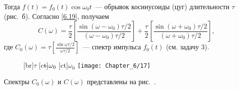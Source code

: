 Тогда $f(t)=f_0(t)\cos\omega_0 t$~--- обрывок косинусоиды (цуг) длительности $\tau$ (рис.~б). Согласно \eqref{6.19},
получаем
\begin{equation*}
	C(\omega)=\frac{\tau}{2}\left[\frac{\sin(\omega-\omega_0)\tau/2}{(\omega-\omega_0)\tau/2}\right]+
\frac{\tau}{2}\left[\frac{\sin(\omega+\omega_0)\tau/2}{(\omega+\omega_0)\tau/2}\right],
\end{equation*}
где $C_0(\omega)=\tau\left[\frac{\sin\omega\tau/2}{\omega\tau/2}\right]$~--- спектр импульса $f_0(t)$ (см. задачу 3).

\begin{figure}
	[br]{$\tau$}
	[ct]{$\llap{$-$}\omega_0$}
	[ct]{$\omega_0$}
	\texttt{[image: Chapter\_6/17]}
	\caption{}
\end{figure}

Спектры $C_0(\omega)$ и $C(\omega)$ представлены на рис.~.

